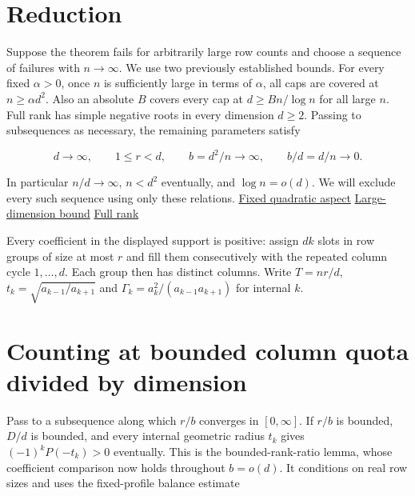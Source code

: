 \section{Reduction}

Suppose the theorem fails for arbitrarily large row counts and choose a sequence of failures with $n\to\infty$. We use two previously established bounds. For every fixed $\alpha>0$, once $n$ is sufficiently large in terms of $\alpha$, all caps are covered at $n\ge\alpha d^2$. Also an absolute $B$ covers every cap at $d\ge B n/\log n$ for all large $n$. Full rank has simple negative roots in every dimension $d\ge2$. Passing to subsequences as necessary, the remaining parameters satisfy

\begin{equation*}
d\to\infty,\qquad 1\le r<d,\qquad
b=d^2/n\to\infty,\qquad b/d=d/n\to0 .
\end{equation*}

In particular $n/d\to\infty$, $n<d^2$ eventually, and $\log n=o(d)$. We will exclude every such sequence using only these relations. \href{https://github.com/ProgramComputer/open-math-research/tree/605cc467a5be93a8408519da331e46f1008df96e/topics/balanced-arrays/critical-aspect}{Fixed quadratic aspect} \enspace \href{https://github.com/ProgramComputer/open-math-research/tree/4fb624ba937a8eecc1361a6066185cd81ab7b172/topics/balanced-arrays/dense-regime}{Large-dimension bound} \enspace \href{https://github.com/ProgramComputer/open-math-research/blob/4fb624ba937a8eecc1361a6066185cd81ab7b172/topics/balanced-arrays/finite-linear-reduction.md}{Full rank}

Every coefficient in the displayed support is positive: assign $dk$ slots in row groups of size at most $r$ and fill them consecutively with the repeated column cycle $1,\ldots,d$. Each group then has distinct columns. Write $T=nr/d$, $t_k=\sqrt{a_{k-1}/a_{k+1}}$ and $\Gamma_k=a_k^2/(a_{k-1}a_{k+1})$ for internal $k$.

\section{Counting at bounded column quota divided by dimension}

Pass to a subsequence along which $r/b$ converges in $[0,\infty]$. If $r/b$ is bounded, $D/d$ is bounded, and every internal geometric radius $t_k$ gives $(-1)^kP(-t_k)>0$ eventually. This is the bounded-rank-ratio lemma, whose coefficient comparison now holds throughout $b=o(d)$. It conditions on real row sizes and uses the fixed-profile balance estimate

